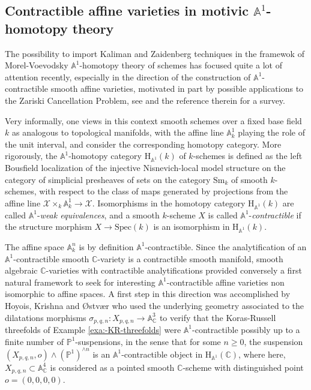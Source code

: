 \documentclass[10pt]{alggeom}
\renewcommand{\geq}{\geqslant}
\theoremstyle{definition}
\numberwithin{equation}{section}
\begin{document}
\subsection{Contractible affine varieties in motivic $\mathbb{A}^{1}$-homotopy
theory}

The possibility to import Kaliman and Zaidenberg techniques in the
framewok of Morel-Voevodsky $\mathbb{A}^{1}$-homotopy theory of schemes
\cite{MV99} has focused quite a lot of attention recently, especially
in the direction of the construction of $\mathbb{A}^{1}$-contractible
smooth affine varieties, motivated in part by possible applications
to the Zariski Cancellation Problem, see \cite{AO21} and the reference
therein for a survey. 

Very informally, one views in this context smooth schemes over a fixed
base field $k$ as analogous to topological manifolds, with the affine
line $\mathbb{A}_{k}^{1}$ playing the role of the unit interval,
and consider the corresponding homotopy category. More rigorously,
the $\mathbb{A}^{1}$-homotopy category $\mathrm{H}_{\mathbb{A}^{1}}(k)$
of $k$-schemes is defined as the left Bousfield localization of the
injective Nisnevich-local model structure on the category of simplicial
presheaves of sets on the category $\mathrm{Sm}_{k}$ of smooth $k$-schemes,
with respect to the class of maps generated by projections from the
affine line $\mathcal{X}\times_{k}\mathbb{A}_{k}^{1}\to\mathcal{X}$.
Isomorphisms in the homotopy category $\mathrm{H}_{\mathbb{A}^{1}}(k)$
are called $\mathbb{A}^{1}$-\emph{weak equivalences}, and a smooth
$k$-scheme $X$ is called $\mathbb{A}^{1}$-\emph{contractible} if
the structure morphism $X\to\mathrm{Spec}(k)$ is an isomorphism in
$\mathrm{H}_{\mathbb{A}^{1}}(k)$. 

\vspace{0.1cm}

The affine space $\mathbb{A}_{k}^{n}$ is by definition $\mathbb{A}^{1}$-contractible.
Since the analytification of an $\mathbb{A}^{1}$-contractible smooth
$\mathbb{C}$-variety is a contractible smooth manifold, smooth algebraic
$\mathbb{C}$-varieties with contractible analytifications provided
conversely a first natural framework to seek for interesting $\mathbb{A}^{1}$-contractible
affine varieties non isomorphic to affine spaces. A first step in
this direction was accomplished by Hoyois, Krishna and {\O}stv{\ae}r
\cite[Theorem 4.2]{HKO16} who used the underlying geometry associated
to the dilatations morphisms $\sigma_{p,q,n}:X_{p,q,n}\to\mathbb{A}_{\mathbb{C}}^{3}$
to verify that the Koras-Russell threefolds of Example \ref{exa:-KR-threefolds}
were $\mathbb{A}^{1}$-contractible possibly up to a finite number
of $\mathbb{P}^{1}$-suspensions, in the sense that for some $n\geq0$,
the suspension $(X_{p,q,n},o)\wedge(\mathbb{P}^{1})^{\wedge n}$ is
an $\mathbb{A}^{1}$-contractible object in $\mathrm{H}_{\mathbb{A}^{1}}(\mathbb{C})$,
where here, $X_{p,q,n}\subset\mathbb{A}_{\mathbb{C}}^{4}$ is considered
as a pointed smooth $\mathbb{C}$-scheme with distinguished point
$o=(0,0,0,0)$. 
\end{document}
